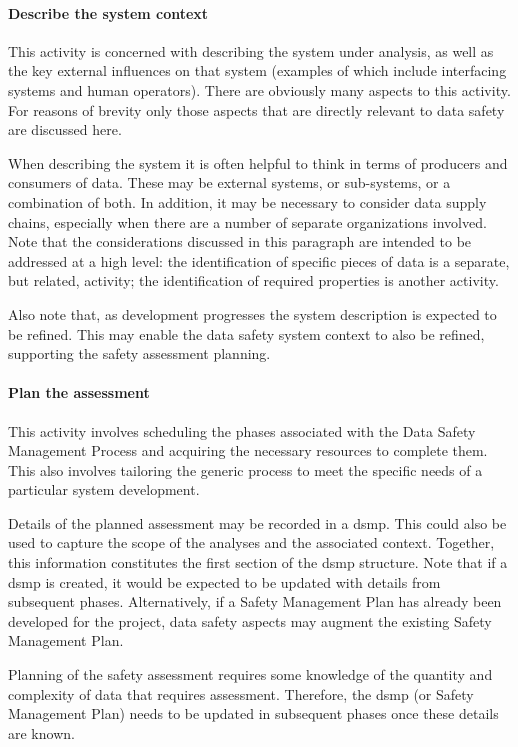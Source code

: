 \paragraph{Describe the system context}
This activity is concerned with describing the system under analysis, as well as the key external influences on that system (examples of which include interfacing systems and human operators). There are obviously many aspects to this activity. For reasons of brevity only those aspects that are directly relevant to data safety are discussed here.

When describing the system it is often helpful to think in terms of producers and consumers of data. These may be external systems, or sub-systems, or a combination of both. In addition, it may be necessary to consider data supply chains, especially when there are a number of separate organizations involved. Note that the considerations discussed in this paragraph are intended to be addressed at a high level: the identification of specific pieces of data is a separate, but related, activity; the identification of required properties is another activity.

Also note that, as development progresses the system description is expected to be refined. This may enable the data safety system context to also be refined, supporting the \gls{safety assessment} planning.

\paragraph{Plan the assessment}
This activity involves scheduling the phases associated with the Data Safety Management Process and acquiring the necessary resources to complete them. This also involves tailoring the generic process to meet the specific needs of a particular system development. 

Details of the planned assessment may be recorded in a \gls{dsmp}. This could also be used to capture the scope of the analyses and the associated context. Together, this \gls{information} constitutes the first section of the \gls{dsmp} structure. Note that if a \gls{dsmp} is created, it would be expected to be updated with details from subsequent phases. Alternatively, if a Safety Management Plan has already been developed for the project, data safety aspects may augment the existing Safety Management Plan. 

Planning of the \gls{safety assessment} requires some knowledge of the quantity and complexity of data that requires assessment. Therefore, the \gls{dsmp} (or Safety Management Plan) needs to be updated in subsequent phases once these details are known.

